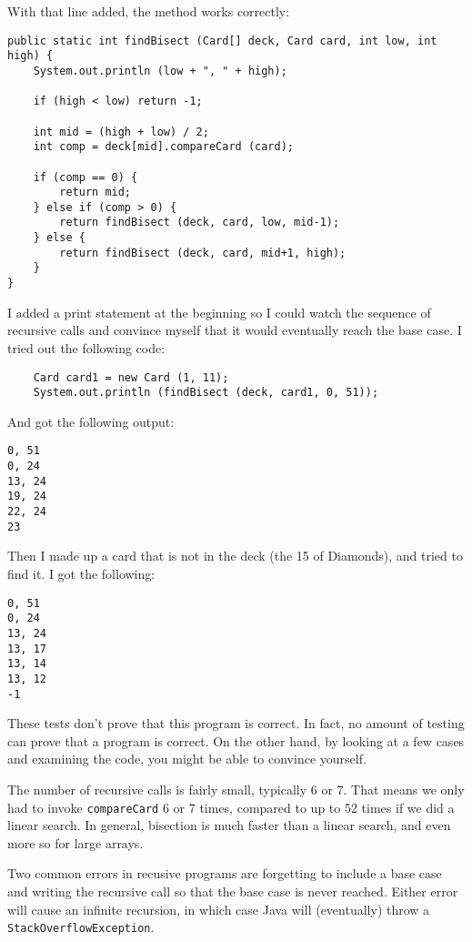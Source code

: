 \documentclass{book}
\begin{document}
With that line added, the method works correctly:

\begin{verbatim}
public static int findBisect (Card[] deck, Card card, int low, int high) {
    System.out.println (low + ", " + high);

    if (high < low) return -1;

    int mid = (high + low) / 2;
    int comp = deck[mid].compareCard (card);

    if (comp == 0) {
        return mid;
    } else if (comp > 0) {
        return findBisect (deck, card, low, mid-1);
    } else {
        return findBisect (deck, card, mid+1, high);
    }
}
\end{verbatim}

I added a print statement at the beginning so I could watch
the sequence of recursive calls and convince myself
that it would eventually reach the base case.  I tried out the
following code:

\begin{verbatim}
    Card card1 = new Card (1, 11);
    System.out.println (findBisect (deck, card1, 0, 51));
\end{verbatim}
%
And got the following output:

\begin{verbatim}
0, 51
0, 24
13, 24
19, 24
22, 24
23
\end{verbatim}
%
Then I made up a card that is not in the deck (the 15 of Diamonds),
and tried to find it.  I got the following:

\begin{verbatim}
0, 51
0, 24
13, 24
13, 17
13, 14
13, 12
-1
\end{verbatim}
%
These tests don't prove that this program is correct.  In fact, no
amount of testing can prove that a program is correct.  On the other
hand, by looking at a few cases and examining the code, you might be
able to convince yourself.


The number of recursive calls is fairly small, typically 6 or 7.
That means we only had to invoke {\tt compareCard} 6 or 7 times,
compared to up to 52 times if we did a linear search.  In general,
bisection is much faster than a linear search, and even more so for
large arrays.

Two common errors in recusive programs are forgetting to include a
base case and writing the recursive call so that the base case is never
reached.  Either error will cause an infinite recursion, in which case
Java will (eventually) throw a {\tt StackOverflowException}.
\end{document}
